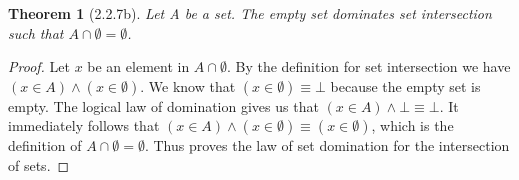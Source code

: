 \documentclass[a4paper, 12pt]{article}
\theoremstyle{plain}
\newtheorem*{theorem*}{Theorem}
\begin{document}
	
	\begin{theorem*}[2.2.7b]
		Let A be a set. The empty set dominates set intersection such that $A \cap \emptyset = \emptyset$.
	\end{theorem*}
	
	\begin{proof}
		Let $x$ be an element in $A \cap \emptyset$. By the definition for set intersection we have 
		$(x \in A) \land (x \in \emptyset)$. We know that $(x \in \emptyset) \equiv \bot$ because 
		the empty set is empty. The logical law of domination gives us that 
		$(x \in A) \land \bot \equiv \bot$. It immediately follows that 
		$(x \in A) \land (x \in \emptyset) \equiv (x \in \emptyset)$, which is the definition of 
		$A \cap \emptyset = \emptyset$. Thus proves the law of set domination for the intersection 
		of sets. 
	\end{proof}
\end{document}
